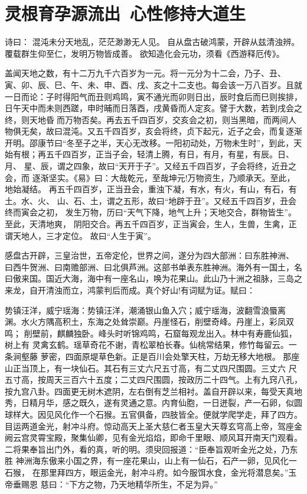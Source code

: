 \chapter{灵根育孕源流出~心性修持大道生}

诗曰：
混沌未分天地乱，茫茫渺渺无人见。
自从盘古破鸿蒙，开辟从兹清浊辨。
覆载群生仰至仁，发明万物皆成善。
欲知造化会元功，须看《西游释厄传》。

盖闻天地之数，有十二万九千六百岁为一元。将一元分为十二会，乃子、丑、
寅、卯、辰、巳、午、未、申、酉、戌、亥之十二支也。每会该一万八百岁。且就
一日而论：子时得阳气而丑则鸡鸣，寅不通光而卯则日出，辰时食后而巳则挨排，
日午天中而未则西蹉，申时晡而日落酉，戌黄昏而人定亥。譬于大数，若到戌会之
终，则天地昏而万物否矣。再去五千四百岁，交亥会之初，则当黑暗，而两间人
物俱无矣，故曰混沌。又五千四百岁，亥会将终，贞下起元，近子之会，而复逐渐
开明。邵康节曰“冬至子之半，天心无改移。一阳初动处，万物未生时”，到此，天
始有根；再五千四百岁，正当子会，轻清上腾，有日，有月，有星，有辰。日、月、
星、辰，谓之四象，故曰“天开于子”。又经五千四百岁，子会将终，近丑之会，而
逐渐坚实。《易》曰：大哉乾元，至哉坤元!万物资生，乃顺承天。至此，地始凝结。
再五千四百岁，正当丑会，重浊下凝，有水，有火，有山，有石，有土。水、火、
山、石、土，谓之五形，故曰“地辟于丑”。又经五千四百岁，丑会终而寅会之初，
发生万物，历曰“天气下降，地气上升；天地交合，群物皆生”。至此，天清地爽，
阴阳交合。再五千四百岁，正当寅会，生人，生兽，生禽，正谓天地人，三才定位。
故曰“人生于寅”。

感盘古开辟，三皇治世，五帝定伦，世界之间，遂分为四大部洲：曰东胜神洲、
曰西牛贺洲、曰南赡部洲、曰北俱芦洲。这部书单表东胜神洲。海外有一国土，名
曰傲来国。国近大海，海中有一座名山，唤为花果山。此山乃十洲之祖脉，三岛之
来龙，自开清浊而立，鸿蒙判后而成。真个好山!有词赋为证。赋曰：

势镇汪洋，威宁瑶海：势镇汪洋，潮涌银山鱼入穴；威宁瑶海，波翻雪浪蜃离
渊。水火方隅高积土，东海之处耸崇巅。丹崖怪石，削壁奇峰。丹崖上，彩凤双鸣；
削壁前，麒麟独卧。峰头时听锦鸡鸣，石窟每观龙出入。林中有寿鹿仙狐，树上有
灵禽玄鹤。瑶草奇花不谢，青松翠柏长春。仙桃常结果，修竹每留云。一条涧壑藤
萝密，四面原堤草色新。正是百川会处擎天柱，万劫无移大地根。
那座山正当顶上，有一块仙石。其石有三丈六尺五寸高，有二丈四尺围圆。三丈六
尺五寸高，按周天三百六十五度；二丈四尺围圆，按政历二十四气。上有九窍八孔，
按九宫八卦。四面更无树木遮阴，左右倒有芝兰相衬。盖自开辟以来，每受天真地
秀，日精月华，感之既久，遂有灵通之意。内育仙胞，一日迸裂，产一石卵，似圆
球样大。因见风化作一个石猴。五官俱备，四肢皆全。便就学爬学走，拜了四方。
目运两道金光，射冲斗府。惊动高天上圣大慈仁者玉皇大天尊玄穹高上帝，驾座金
阙云宫灵霄宝殿，聚集仙卿，见有金光焰焰，即命千里眼、顺风耳开南天门观看。
二将果奉旨出门外，看的真，听的明。须臾回报道：“臣奉旨观听金光之处，乃东胜
神洲海东傲来小国之界，有一座花果山，山上有一仙石，石产一卵，见风化一石猴，
在那里拜四方，眼运金光，射冲斗府。如今服饵水食，金光将潜息矣。”玉帝垂赐恩
慈曰：“下方之物，乃天地精华所生，不足为异。”

